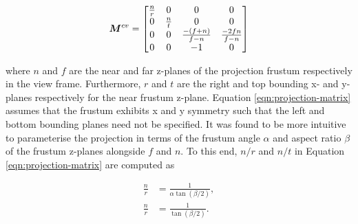 \begin{equation}
	\bm{M}^{cv}=
	\begin{bmatrix}
		\frac{n}{r} & 0 & 0 & 0 \\
		0 & \frac{n}{t} & 0 & 0 \\
		0 & 0 & \frac{-(f+n)}{f-n} & \frac{-2fn}{f-n} \\
		0 & 0 & -1 & 0
	\end{bmatrix}
\label{eqn:projection-matrix}
\end{equation}

where $n$ and $f$ are the near and far z-planes of the projection frustum respectively in the view frame. Furthermore, $r$ and $t$ are the right and top bounding x- and y-planes respectively for the near frustum z-plane. Equation \ref{eqn:projection-matrix} assumes that the frustum exhibits x and y symmetry such that the left and bottom bounding planes need not be specified. It was found to be more intuitive to parameterise the projection in terms of the frustum angle $\alpha$ and aspect ratio $\beta$ of the frustum z-planes alongside $f$ and $n$. To this end, $n/r$ and $n/t$ in Equation \ref{eqn:projection-matrix} are computed as

\begin{align}
	\frac{n}{r}&=\frac{1}{\alpha\tan(\beta/2)},\\
	\frac{n}{r}&=\frac{1}{\tan(\beta/2)}.
\end{align} 

